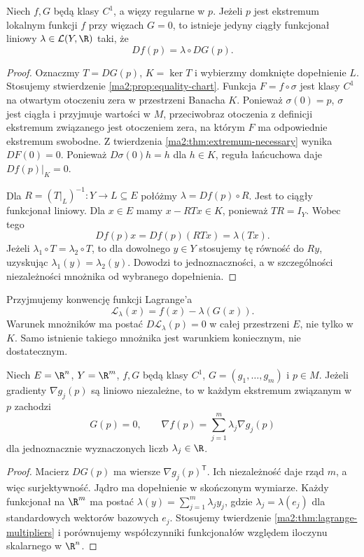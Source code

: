 \begin{twierdzenie}
\label{ma2:thm:lagrange-multipliers}
Niech $f,G$ będą klasy $C^1$, a więzy regularne w $p$.
Jeżeli $p$ jest ekstremum lokalnym funkcji $f$ przy
więzach $G=0$, to istnieje jedyny ciągły funkcjonał
liniowy $\lambda\in\mathcal L(Y,\R)$ taki, że
\[
 Df(p)=\lambda\circ DG(p).
\]
\end{twierdzenie}
\begin{proof}
Oznaczmy $T=DG(p)$, $K=\ker T$ i wybierzmy domknięte
dopełnienie $L$. Stosujemy stwierdzenie
\ref{ma2:prop:equality-chart}. Funkcja $F=f\circ\sigma$
jest klasy $C^1$ na otwartym otoczeniu zera w przestrzeni
Banacha $K$. Ponieważ $\sigma(0)=p$, $\sigma$ jest ciągła
i przyjmuje wartości w $M$, przeciwobraz otoczenia
z definicji ekstremum związanego jest otoczeniem zera,
na którym $F$ ma odpowiednie ekstremum swobodne. Z twierdzenia
\ref{ma2:thm:extremum-necessary} wynika $DF(0)=0$.
Ponieważ $D\sigma(0)h=h$ dla $h\in K$, reguła
łańcuchowa daje $Df(p)|_K=0$.

Dla $R=(T|_L)^{-1}:Y\to L\subseteq E$ połóżmy
$\lambda=Df(p)\circ R$. Jest to ciągły funkcjonał
liniowy. Dla $x\in E$ mamy $x-RTx\in K$, ponieważ
$TR=I_Y$. Wobec tego
\[
 Df(p)x=Df(p)(RTx)=\lambda(Tx).
\]
Jeżeli $\lambda_1\circ T=\lambda_2\circ T$, to
dla dowolnego $y\in Y$ stosujemy tę równość do $Ry$,
uzyskując $\lambda_1(y)=\lambda_2(y)$. Dowodzi to
jednoznaczności, a w szczególności niezależności
mnożnika od wybranego dopełnienia.
\end{proof}

Przyjmujemy konwencję funkcji Lagrange'a
\[
 \mathcal{L}_\lambda(x)=f(x)-\lambda(G(x)).
\]
Warunek mnożników ma postać $D\mathcal{L}_\lambda(p)=0$
w całej przestrzeni $E$, nie tylko w $K$. Samo istnienie
takiego mnożnika jest warunkiem koniecznym,
nie dostatecznym.

\begin{wniosek}
\label{ma2:cor:lagrange-finite}
Niech $E=\R^n$, $Y=\R^m$, $f,G$ będą klasy $C^1$,
$G=(g_1,\ldots,g_m)$ i $p\in M$.
Jeżeli gradienty $\nabla g_j(p)$ są liniowo niezależne,
to w każdym ekstremum związanym w $p$ zachodzi
\[
 G(p)=0,\qquad
 \nabla f(p)=\sum_{j=1}^m\lambda_j\nabla g_j(p)
\]
dla jednoznacznie wyznaczonych liczb $\lambda_j\in\R$.
\end{wniosek}
\begin{proof}
Macierz $DG(p)$ ma wiersze $\nabla g_j(p)^{\mathsf T}$.
Ich niezależność daje rząd $m$, a więc surjektywność.
Jądro ma dopełnienie w skończonym wymiarze.
Każdy funkcjonał na $\R^m$ ma postać
$\lambda(y)=\sum_{j=1}^m\lambda_j y_j$, gdzie
$\lambda_j=\lambda(e_j)$ dla standardowych
wektorów bazowych $e_j$. Stosujemy
twierdzenie \ref{ma2:thm:lagrange-multipliers}
i porównujemy współczynniki funkcjonałów względem
iloczynu skalarnego w $\R^n$.
\end{proof}

